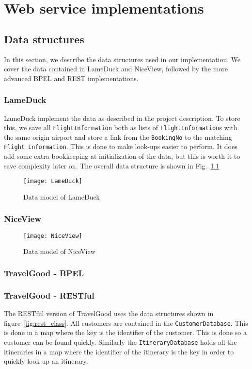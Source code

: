 {\setlength{\chapterfontsize}{23pt}
\chapter{Web service implementations}
}

\section{Data structures}
In this section, we describe the data structures used in our implementation. We cover the data contained in LameDuck and NiceView, followed by the more advanced BPEL and REST implementations.

\subsection{LameDuck}
LameDuck implement the data as described in the project description. To store this, we save all \texttt{FlightInformation} both as lists of \texttt{FlightInformation}s with the same origin airport and store a link from the \texttt{BookingNo} to the matching \texttt{Flight Information}. This is done to make look-ups easier to perform. It does add some extra bookkeeping at initialization of the data, but this is worth it to save complexity later on. The overall data structure is shown in Fig.~\ref{fig:lameduck_class}

\begin{figure}[H]
\centering
\texttt{[image: LameDuck]}
\caption{Data model of LameDuck}
\label{fig:lameduck_class}
\end{figure}


\subsection{NiceView}
\begin{figure}[H]
\centering
\texttt{[image: NiceView]}
\caption{Data model of NiceView}
\label{fig:niceview_class}
\end{figure}

\subsection{TravelGood - BPEL}

\subsection{TravelGood - RESTful}
The RESTful version of TravelGood uses the data structures shown in figure~\ref{fig:rest_class}. All customers are contained in the \texttt{CustomerDatabase}. This is done in a map where the key is the identifier of the customer. This is done so a customer can be found quickly. Similarly the \texttt{ItineraryDatabase} holds all the itineraries in a map where the identifier of the itinerary is the key in order to quickly look up an itinerary.


